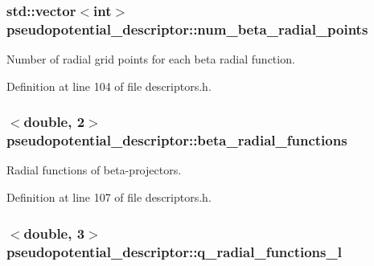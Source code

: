 \hypertarget{structpseudopotential__descriptor_abb989ec455c493c88f4d115afba25afd}{}
\subsubsection[{num\+\_\+beta\+\_\+radial\+\_\+points}]{\setlength{\rightskip}{0pt plus 5cm}std\+::vector$<$int$>$ pseudopotential\+\_\+descriptor\+::num\+\_\+beta\+\_\+radial\+\_\+points}\label{structpseudopotential__descriptor_abb989ec455c493c88f4d115afba25afd}


Number of radial grid points for each beta radial function. 



Definition at line 104 of file descriptors.\+h.

\hypertarget{structpseudopotential__descriptor_adc359985f0583a7ac7a118cea93a9b30}{}
\subsubsection[{beta\+\_\+radial\+\_\+functions}]{$<$double, 2$>$ pseudopotential\+\_\+descriptor\+::beta\+\_\+radial\+\_\+functions}\label{structpseudopotential__descriptor_adc359985f0583a7ac7a118cea93a9b30}


Radial functions of beta-\/projectors. 



Definition at line 107 of file descriptors.\+h.

\hypertarget{structpseudopotential__descriptor_aba718fec7abb8fd022c1dde98b0b7fee}{}
\subsubsection[{q\+\_\+radial\+\_\+functions\+\_\+l}]{$<$double, 3$>$ pseudopotential\+\_\+descriptor\+::q\+\_\+radial\+\_\+functions\+\_\+l}\label{structpseudopotential__descriptor_aba718fec7abb8fd022c1dde98b0b7fee}


